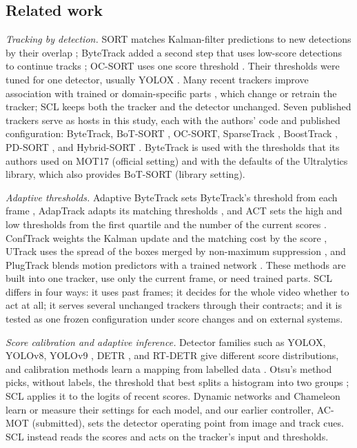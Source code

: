 \documentclass[pdflatex,sn-mathphys-num,iicol]{sn-jnl}
\newcommand{\scl}{SCL}
\begin{document}
\subsection{Related work}\label{sec:survey}
\emph{Tracking by detection.}\label{sec:hosts} SORT matches Kalman-filter predictions to new
detections by their overlap \cite{bewley2016sort}; ByteTrack added a second step that uses
low-score detections to continue tracks \cite{zhang2022bytetrack}; OC-SORT uses one score
threshold \cite{cao2023ocsort}. Their thresholds were tuned for one detector, usually YOLOX
\cite{ge2021yolox}. Many recent trackers improve association with trained or domain-specific
parts \cite{li2024fdbtrack,bao2024graphmatching,zhang2025sinkhorn,ding2025remot,liang2024motiontrack,sun2026bsr},
which change or retrain the tracker; \scl{} keeps both the tracker and the detector unchanged.
Seven published trackers serve as hosts in this study, each with the authors' code and published
configuration: ByteTrack, BoT-SORT \cite{aharon2022botsort}, OC-SORT, SparseTrack
\cite{liu2025sparsetrack}, BoostTrack \cite{stanojevic2024boosttrack}, PD-SORT
\cite{wang2025pdsort}, and Hybrid-SORT \cite{yang2024hybridsort}. ByteTrack is used with the
thresholds that its authors used on MOT17 (official setting) and with the defaults of the
Ultralytics library, which also provides BoT-SORT (library setting).

\emph{Adaptive thresholds.} Adaptive ByteTrack sets ByteTrack's threshold from each frame
\cite{ma2023adaptivebytetrack}, AdapTrack adapts its matching thresholds \cite{shim2024adaptrack},
and ACT sets the high and low thresholds from the first quartile and the number of the current
scores \cite{act2026adaptive}. ConfTrack weights the Kalman update and the matching cost by the
score \cite{jung2024conftrack}, UTrack uses the spread of the boxes merged by non-maximum
suppression \cite{solano2025utrack}, and PlugTrack blends motion predictors with a trained network
\cite{kim2026plugtrack}. These methods are built into one tracker, use only the current frame, or
need trained parts. \scl{} differs in four ways: it uses past frames; it decides for the whole video
whether to act at all; it serves several unchanged trackers through their contracts; and it is
tested as one frozen configuration under score changes and on external systems.

\emph{Score calibration and adaptive inference.} Detector families such as YOLOX, YOLOv8, YOLOv9
\cite{wang2024yolov9}, DETR \cite{carion2020detr}, and RT-DETR give different score distributions,
and calibration methods learn a mapping from labelled data \cite{kuppers2020detcalib}. Otsu's
method picks, without labels, the threshold that best splits a histogram into two groups
\cite{otsu1979}; \scl{} applies it to the logits of recent scores. Dynamic networks
\cite{han2022dynamic} and Chameleon \cite{jiang2018chameleon} learn or measure their settings for
each model, and our earlier controller, AC-MOT (submitted), sets the detector operating point from
image and track cues. \scl{} instead reads the scores and acts on the tracker's input and
thresholds.
\end{document}
